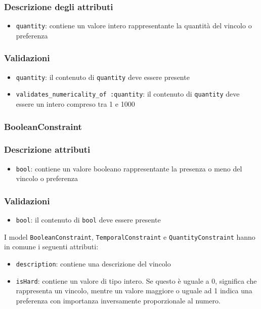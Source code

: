 \documentclass[11pt,a4paper]{article}
\begin{document}
\subsubsection*{Descrizione degli attributi}
\begin{itemize}
 \item \verb|quantity|: contiene un valore intero rappresentante la quantità del vincolo o preferenza
\end{itemize}
\subsubsection*{Validazioni}
\begin{itemize}
 \item \verb|quantity|: il contenuto di \verb|quantity| deve essere presente
 \item \verb|validates_numericality_of :quantity|: il contenuto di \verb|quantity| deve essere un intero compreso tra 1 e 1000
\end{itemize}
\subsubsection{BooleanConstraint}
\subsubsection*{Descrizione attributi}
\begin{itemize}
 \item \verb|bool|: contiene un valore booleano rappresentante la presenza o meno del vincolo o preferenza
\end{itemize}
\subsubsection*{Validazioni}
\begin{itemize}
 \item \verb|bool|: il contenuto di \verb|bool| deve essere presente
\end{itemize}
I model \verb|BooleanConstraint|, \verb|TemporalConstraint| e \verb|QuantityConstraint|
hanno in comune i seguenti attributi:
\begin{itemize}
 \item \verb|description|: contiene una descrizione del vincolo
 \item \verb|isHard|: contiene un valore di tipo intero. Se questo è uguale a 0, significa che rappresenta un vincolo, mentre un valore maggiore o uguale ad 1 indica una preferenza con importanza inversamente proporzionale al numero.
 \end{itemize}
\end{document}
